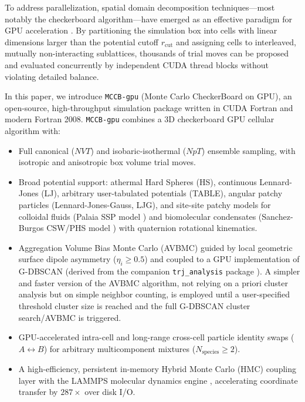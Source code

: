 \documentclass[final,5p,times,twocolumn]{elsarticle}
\begin{document}
To address parallelization, spatial domain decomposition
techniques—most notably the checkerboard algorithm—have
emerged as an effective paradigm for GPU acceleration
\cite{preis2009gpu,anderson2013checkerboard}. By partitioning the
simulation box into cells with linear dimensions larger than the
potential cutoff $r_{\text{cut}}$ and assigning cells to interleaved,
mutually non-interacting sublattices, thousands of trial moves can be
proposed and evaluated concurrently by independent CUDA thread blocks
without violating detailed balance. 

In this paper, we introduce \texttt{MCCB-gpu} (Monte Carlo
CheckerBoard on GPU), an open-source, high-throughput simulation
package written in CUDA Fortran and modern Fortran
2008. \texttt{MCCB-gpu} combines a 3D checkerboard GPU cellular  algorithm
with: 
\begin{itemize}
    \item Full canonical ($NVT$) and isobaric-isothermal ($NpT$) ensemble sampling, with isotropic and anisotropic box volume trial moves.
    \item Broad potential support: athermal Hard Spheres (HS), continuous Lennard-Jones (LJ), arbitrary user-tabulated potentials (TABLE), angular patchy particles (Lennard-Jones-Gauss, LJG)\cite{Doye07,Noya21}, and site-site patchy models for colloidal fluids (Palaia SSP model \cite{palaia2022patchy}) and biomolecular condensates (Sanchez-Burgos CSW/PHS model \cite{sanchezburgos2021size}) with quaternion rotational kinematics.
    \item %
    Aggregation Volume Bias Monte Carlo (AVBMC)
 \cite{chen2000avbmc,chen2001avbmc} guided by local geometric surface
 dipole asymmetry ($\eta_i \ge 0.5$) and coupled to a GPU
 implementation of G-DBSCAN (derived from the companion
 \texttt{trj\_analysis} package
 \cite{andrade2013gdbscan,trjanaly2026}).  A simpler and faster version of the
 AVBMC algorithm, not relying on a priori cluster analysis but on simple neighbor
 counting, is employed until a user-specified threshold cluster size
 is reached and the full G-DBSCAN cluster search/AVBMC is triggered. 

    \item GPU-accelerated intra-cell and long-range cross-cell particle identity swaps ($A \leftrightarrow B$) for arbitrary multicomponent mixtures ($N_{\text{species}} \ge 2$).
    \item A high-efficiency, persistent in-memory Hybrid Monte Carlo (HMC) coupling layer with the LAMMPS molecular dynamics engine \cite{thompson2022lammps}, accelerating coordinate transfer by $287\times$ over disk I/O.
\end{itemize}
\end{document}
